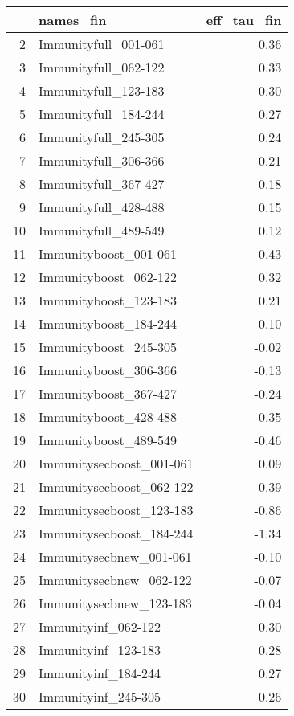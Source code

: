 \begin{table}[ht]
\centering
\begin{tabular}{rlr}
  \hline
 & names\_fin & eff\_tau\_fin \\ 
  \hline
2 & Immunityfull\_001-061 & 0.36 \\ 
  3 & Immunityfull\_062-122 & 0.33 \\ 
  4 & Immunityfull\_123-183 & 0.30 \\ 
  5 & Immunityfull\_184-244 & 0.27 \\ 
  6 & Immunityfull\_245-305 & 0.24 \\ 
  7 & Immunityfull\_306-366 & 0.21 \\ 
  8 & Immunityfull\_367-427 & 0.18 \\ 
  9 & Immunityfull\_428-488 & 0.15 \\ 
  10 & Immunityfull\_489-549 & 0.12 \\ 
  11 & Immunityboost\_001-061 & 0.43 \\ 
  12 & Immunityboost\_062-122 & 0.32 \\ 
  13 & Immunityboost\_123-183 & 0.21 \\ 
  14 & Immunityboost\_184-244 & 0.10 \\ 
  15 & Immunityboost\_245-305 & -0.02 \\ 
  16 & Immunityboost\_306-366 & -0.13 \\ 
  17 & Immunityboost\_367-427 & -0.24 \\ 
  18 & Immunityboost\_428-488 & -0.35 \\ 
  19 & Immunityboost\_489-549 & -0.46 \\ 
  20 & Immunitysecboost\_001-061 & 0.09 \\ 
  21 & Immunitysecboost\_062-122 & -0.39 \\ 
  22 & Immunitysecboost\_123-183 & -0.86 \\ 
  23 & Immunitysecboost\_184-244 & -1.34 \\ 
  24 & Immunitysecbnew\_001-061 & -0.10 \\ 
  25 & Immunitysecbnew\_062-122 & -0.07 \\ 
  26 & Immunitysecbnew\_123-183 & -0.04 \\ 
  27 & Immunityinf\_062-122 & 0.30 \\ 
  28 & Immunityinf\_123-183 & 0.28 \\ 
  29 & Immunityinf\_184-244 & 0.27 \\ 
  30 & Immunityinf\_245-305 & 0.26 \\ 

\end{tabular}
\end{table}
